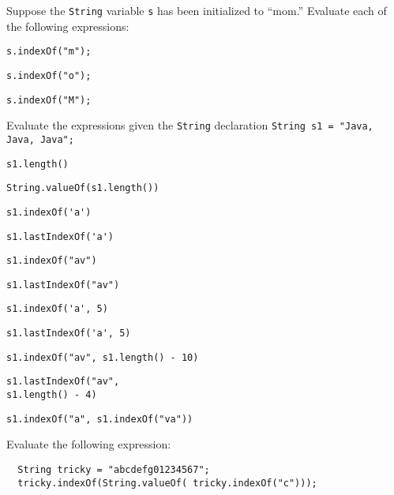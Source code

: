 \begin{SSTUDY}

\item  Suppose the {\tt String} variable {\tt s} has been
initialized to ``mom.'' Evaluate each of the following
expressions:

\begin{EXRLL}

\begin{multicols}{3}
\item  \verb|s.indexOf("m");|  
\item  \verb|s.indexOf("o");|  
\item  \verb|s.indexOf("M");|  
\end{multicols}

\end{EXRLL}

\item  Evaluate the  expressions given the {\tt String} declaration
\verb|String s1 = "Java, Java, Java";|

\begin{EXRLL}\columnsep=0pt
\scriptsize
\begin{multicols}{2}
\item  \verb|s1.length()|                      
\item  \verb|String.valueOf(s1.length())|      
\item  \verb|s1.indexOf('a')|                  
\item  \verb|s1.lastIndexOf('a')|              
\item  \verb|s1.indexOf("av")|                 
\item  \verb|s1.lastIndexOf("av")|           
\item  \verb|s1.indexOf('a', 5)|               
\item  \verb|s1.lastIndexOf('a', 5)|           
\item \verb|s1.indexOf("av", s1.length() - 10)|      
\item \verb|s1.lastIndexOf("av",| \\\verb|s1.length() - 4)|   
\item \verb|s1.indexOf("a", s1.indexOf("va"))|       
\end{multicols}
\normalsize
\end{EXRLL}

\item  Evaluate the following expression:

\begin{jjjlisting}
\begin{lstlisting}
  String tricky = "abcdefg01234567";
  tricky.indexOf(String.valueOf( tricky.indexOf("c")));
\end{lstlisting}
\end{jjjlisting}
\end{SSTUDY}

